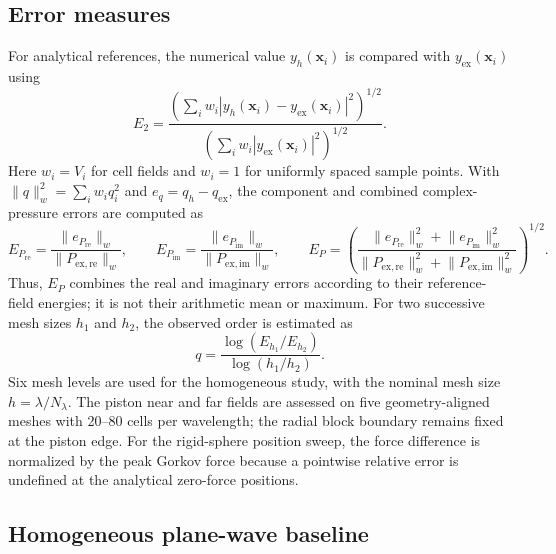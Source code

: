 \documentclass[final,12pt,nopreprintline,longtitle]{elsarticle}
\newcommand{\x}{\mathbf{x}}
\begin{document}
\subsection{Error measures}
\label{sec:errorMeasures}

For analytical references, the numerical value $y_h(\x_i)$ is compared with
$y_{\mathrm{ex}}(\x_i)$ using
\begin{equation}
    E_2 =
    \frac{\left(\sum_i w_i|y_h(\x_i)-y_{\mathrm{ex}}(\x_i)|^2\right)^{1/2}}
    {\left(\sum_i w_i|y_{\mathrm{ex}}(\x_i)|^2\right)^{1/2}}.
    \label{eq:errorMeasures}
\end{equation}
Here $w_i=V_i$ for cell fields and $w_i=1$ for uniformly spaced sample
points.  With $\lVert q\rVert_w^2=\sum_iw_iq_i^2$ and
$e_q=q_h-q_{\mathrm{ex}}$, the component and combined complex-pressure errors
are computed as
\begin{equation}
    E_{P_{\mathrm{re}}}
    =\frac{\lVert e_{P_{\mathrm{re}}}\rVert_w}
           {\lVert P_{\mathrm{ex},\mathrm{re}}\rVert_w},
    \qquad
    E_{P_{\mathrm{im}}}
    =\frac{\lVert e_{P_{\mathrm{im}}}\rVert_w}
           {\lVert P_{\mathrm{ex},\mathrm{im}}\rVert_w},
    \qquad
    E_P
    =\left(
      \frac{\lVert e_{P_{\mathrm{re}}}\rVert_w^2
           +\lVert e_{P_{\mathrm{im}}}\rVert_w^2}
           {\lVert P_{\mathrm{ex},\mathrm{re}}\rVert_w^2
           +\lVert P_{\mathrm{ex},\mathrm{im}}\rVert_w^2}
      \right)^{1/2}.
    \label{eq:complexPressureErrors}
\end{equation}
Thus, $E_P$ combines the real and imaginary errors according to their
reference-field energies; it is not their arithmetic mean or maximum.
For two successive mesh sizes $h_1$ and $h_2$, the observed order is estimated
as
\begin{equation}
    q=\frac{\log(E_{h_1}/E_{h_2})}{\log(h_1/h_2)}.
    \label{eq:observedOrder}
\end{equation}
Six mesh levels are used for the homogeneous study, with the nominal mesh size
$h=\lambda/N_\lambda$.  The piston near and far fields are assessed on five
geometry-aligned meshes with 20--80 cells per
wavelength; the radial block boundary remains fixed at the piston edge.  For
the rigid-sphere position sweep, the force
difference is normalized by the peak
Gorkov force because a pointwise relative error is undefined at the analytical
zero-force positions.

\subsection{Homogeneous plane-wave baseline}
\label{sec:homogeneousBaseline}
\end{document}

